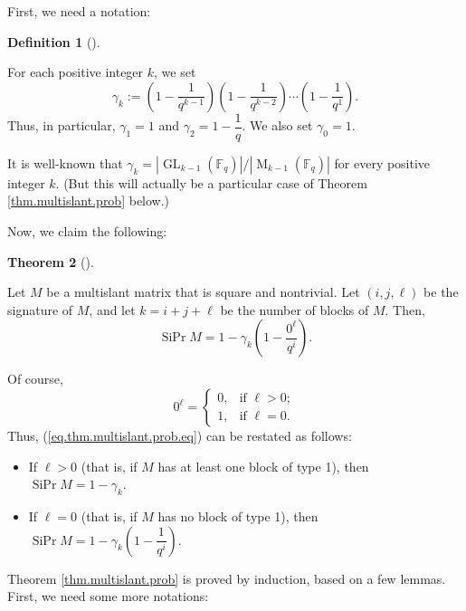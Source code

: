 \documentclass[numbers=enddot,12pt,final,onecolumn,notitlepage]{scrartcl}%
\theoremstyle{definition}
\newtheorem{theo}{Theorem}[section]
\newenvironment{theorem}[1][]
{\begin{theo}[#1]\begin{leftbar}}
{\end{leftbar}\end{theo}}
\newtheorem{defi}[theo]{Definition}
\newenvironment{definition}[1][]
{\begin{defi}[#1]\begin{leftbar}}
{\end{leftbar}\end{defi}}
\newcommand{\Fq}{\mathbb{F}_q}
\theoremstyle{plainsl}
\begin{document}
First, we need a notation:

\begin{definition}
\label{def.gammak}For each positive integer $k$, we set%
\[
\gamma_{k}:=\left(  1-\dfrac{1}{q^{k-1}}\right)  \left(  1-\dfrac{1}{q^{k-2}%
}\right)  \cdots\left(  1-\dfrac{1}{q^{1}}\right)  .
\]
Thus, in particular, $\gamma_{1}=1$ and $\gamma_{2}=1-\dfrac{1}{q}$. We also
set $\gamma_{0}=1$.
\end{definition}

It is well-known that $\gamma_{k}=\left\vert \operatorname*{GL}\nolimits_{k-1}%
\left(  \Fq\right)  \right\vert /\left\vert \operatorname*{M}%
\nolimits_{k-1}\left(  \Fq\right)  \right\vert $ for every positive
integer $k$. (But this will actually be a particular case of Theorem
\ref{thm.multislant.prob} below.)

Now, we claim the following:

\begin{theorem}
\label{thm.multislant.prob}Let $M$ be a multislant matrix that is square and
nontrivial. Let $\left(  i,j,\ell\right)  $ be the signature of $M$, and let
$k=i+j+\ell$ be the number of blocks of $M$. Then,%
\begin{equation}
\operatorname*{SiPr}M=1-\gamma_{k}\left(  1-\dfrac{0^{\ell}}{q^{i}}\right)  .
\label{eq.thm.multislant.prob.eq}%
\end{equation}

\end{theorem}

Of course,
\[
0^{\ell}=%
\begin{cases}
0, & \text{if }\ell>0;\\
1, & \text{if }\ell=0.
\end{cases}
\]
Thus, (\ref{eq.thm.multislant.prob.eq}) can be restated as follows:

\begin{itemize}
\item If $\ell>0$ (that is, if $M$ has at least one block of type 1), then
$\operatorname*{SiPr}M=1-\gamma_{k}$.

\item If $\ell=0$ (that is, if $M$ has no block of type 1), then
$\operatorname*{SiPr}M=1-\gamma_{k}\left(  1-\dfrac{1}{q^{i}}\right)  $.
\end{itemize}

Theorem \ref{thm.multislant.prob} is proved by induction, based on a few
lemmas. First, we need some more notations:
\end{document}
